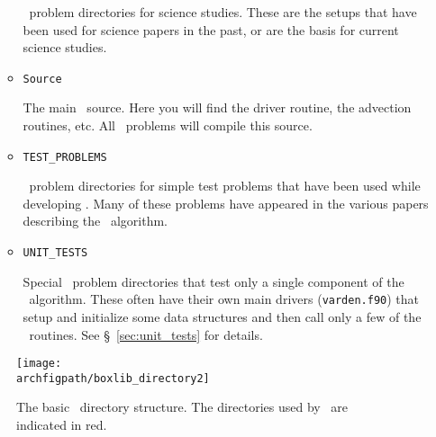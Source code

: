 \begin{itemize}
\begin{itemize}
    \maestro\ problem directories for science studies.  These are the
    setups that have been used for science papers in the past, or are
    the basis for current science studies.

  \item {\tt Source}

    The main \maestro\ source.  Here you will find the driver routine,
    the advection routines, etc.  All \maestro\ problems will compile
    this source.

  \item {\tt TEST\_PROBLEMS}
 
    \maestro\ problem directories for simple test problems that have
    been used while developing \maestro.  Many of these problems have
    appeared in the various papers describing the \maestro\ algorithm.

  \item {\tt UNIT\_TESTS}

    Special \maestro\ problem directories that test only a single component
    of the \maestro\ algorithm.  These often have their own main drivers
    ({\tt varden.f90}) that setup and initialize some data structures and
    then call only a few of the \maestro\ routines.  See \S~\ref{sec:unit_tests}
    for details.

  \end{itemize}

\end{itemize}


\begin{figure}[t]
\centering
\texttt{[image: \\archfigpath/boxlib\_directory2]}
\caption[\boxlib\ directory structure]
{The basic \boxlib\ directory structure.  The directories used
by \maestro\ are indicated in red.}
\end{figure}


